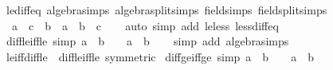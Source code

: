 \begin{isabellebody}
\endisatagproof
{\isafoldproof}%
%
\isadelimproof
\isanewline
%
\endisadelimproof
\isanewline
{}\isamarkupfalse%
\ le{\isacharunderscore}{\kern0pt}diff{\isacharunderscore}{\kern0pt}eq\ {\isacharbrackleft}{\kern0pt}algebra{\isacharunderscore}{\kern0pt}simps{\isacharcomma}{\kern0pt}\ algebra{\isacharunderscore}{\kern0pt}split{\isacharunderscore}{\kern0pt}simps{\isacharcomma}{\kern0pt}\ field{\isacharunderscore}{\kern0pt}simps{\isacharcomma}{\kern0pt}\ field{\isacharunderscore}{\kern0pt}split{\isacharunderscore}{\kern0pt}simps{\isacharbrackright}{\kern0pt}{\isacharcolon}{\kern0pt}\isanewline
\ \ {\isachardoublequoteopen}a\ {\isasymle}\ c\ {\isacharminus}{\kern0pt}\ b\ {\isasymlongleftrightarrow}\ a\ {\isacharplus}{\kern0pt}\ b\ {\isasymle}\ c{\isachardoublequoteclose}\isanewline
%
\isadelimproof
\ \ %
\endisadelimproof
%
\isatagproof
{}\isamarkupfalse%
\ {\isacharparenleft}{\kern0pt}auto\ simp\ add{\isacharcolon}{\kern0pt}\ le{\isacharunderscore}{\kern0pt}less\ less{\isacharunderscore}{\kern0pt}diff{\isacharunderscore}{\kern0pt}eq{\isacharparenright}{\kern0pt}%
\endisatagproof
{\isafoldproof}%
%
\isadelimproof
\isanewline
%
\endisadelimproof
\isanewline
{}\isamarkupfalse%
\ diff{\isacharunderscore}{\kern0pt}le{\isacharunderscore}{\kern0pt}{}{\isacharunderscore}{\kern0pt}iff{\isacharunderscore}{\kern0pt}le\ {\isacharbrackleft}{\kern0pt}simp{\isacharbrackright}{\kern0pt}{\isacharcolon}{\kern0pt}\ {\isachardoublequoteopen}a\ {\isacharminus}{\kern0pt}\ b\ {\isasymle}\ {}\ {\isasymlongleftrightarrow}\ a\ {\isasymle}\ b{\isachardoublequoteclose}\isanewline
%
\isadelimproof
\ \ %
\endisadelimproof
%
\isatagproof
{}\isamarkupfalse%
\ {\isacharparenleft}{\kern0pt}simp\ add{\isacharcolon}{\kern0pt}\ algebra{\isacharunderscore}{\kern0pt}simps{\isacharparenright}{\kern0pt}%
\endisatagproof
{\isafoldproof}%
%
\isadelimproof
\isanewline
%
\endisadelimproof
\isanewline
{}\isamarkupfalse%
\ le{\isacharunderscore}{\kern0pt}iff{\isacharunderscore}{\kern0pt}diff{\isacharunderscore}{\kern0pt}le{\isacharunderscore}{\kern0pt}{}\ {\isacharequal}{\kern0pt}\ diff{\isacharunderscore}{\kern0pt}le{\isacharunderscore}{\kern0pt}{}{\isacharunderscore}{\kern0pt}iff{\isacharunderscore}{\kern0pt}le\ {\isacharbrackleft}{\kern0pt}symmetric{\isacharbrackright}{\kern0pt}\isanewline
\isanewline
{}\isamarkupfalse%
\ diff{\isacharunderscore}{\kern0pt}ge{\isacharunderscore}{\kern0pt}{}{\isacharunderscore}{\kern0pt}iff{\isacharunderscore}{\kern0pt}ge\ {\isacharbrackleft}{\kern0pt}simp{\isacharbrackright}{\kern0pt}{\isacharcolon}{\kern0pt}\ {\isachardoublequoteopen}a\ {\isacharminus}{\kern0pt}\ b\ {\isasymge}\ {}\ {\isasymlongleftrightarrow}\ a\ {\isasymge}\ b{\isachardoublequoteclose}\isanewline

\end{isabellebody}
